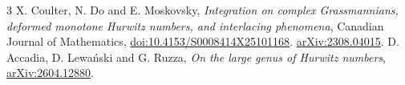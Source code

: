 \documentclass[11pt]{article}
\begin{document}
\begin{thebibliography}{3}
 X. Coulter, N. Do and E. Moskovsky, \emph{Integration on complex Grassmannians, deformed monotone Hurwitz numbers, and interlacing phenomena}, Canadian Journal of Mathematics, \href{https://doi.org/10.4153/S0008414X25101168}{doi:10.4153/S0008414X25101168}. \href{https://arxiv.org/abs/2308.04015}{arXiv:2308.04015}.
 D. Accadia, D. Lewański and G. Ruzza, \emph{On the large genus of Hurwitz numbers}, \href{https://arxiv.org/abs/2604.12880}{arXiv:2604.12880}.
\end{thebibliography}
\end{document}
